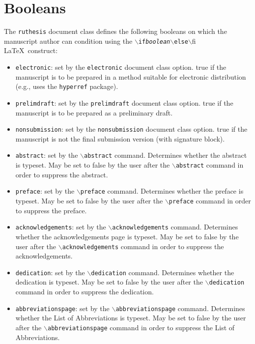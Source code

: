 \section{Booleans}
The \texttt{ruthesis} document class defines the following booleans on which the manuscript author can condition using the $\backslash$\texttt{if\it{boolean}}$\backslash$\texttt{else}$\backslash$fi \LaTeX\ construct:
\begin{itemize}
\item \texttt{electronic}: set by the \texttt{electronic} document class option.
      true if the manuscript is to be prepared in a method suitable for electronic distribution (e.g., uses the \texttt{hyperref} package).
\item \texttt{prelimdraft}: set by the \texttt{prelimdraft} document class option.
      true if the manuscript is to be prepared as a preliminary draft.
\item \texttt{nonsubmission}: set by the \texttt{nonsubmission} document class option.
      true if the manuscript is not the final submission version (with signature block).
\item \texttt{abstract}: set by the $\backslash$\texttt{abstract} command.
      Determines whether the abstract is typeset.
      May be set to false by the user after the $\backslash$\texttt{abstract} command in order to suppress the abstract.
\item \texttt{preface}: set by the $\backslash$\texttt{preface} command.
      Determines whether the preface is typeset.
      May be set to false by the user after the $\backslash$\texttt{preface} command in order to suppress the preface.
\item \texttt{acknowledgements}: set by the $\backslash$\texttt{acknowledgements} command.
      Determines whether the acknowledgements page is typeset.
      May be set to false by the user after the $\backslash$\texttt{acknowledgements} command in order to suppress the acknowledgements.
\item \texttt{dedication}: set by the $\backslash$\texttt{dedication} command.
      Determines whether the dedication is typeset.
      May be set to false by the user after the $\backslash$\texttt{dedication} command in order to suppress the dedication.
\item \texttt{abbreviationspage}: set by the $\backslash$\texttt{abbreviationspage} command.
      Determines whether the List of Abbreviations is typeset.
      May be set to false by the user after the $\backslash$\texttt{abbreviationspage} command in order to suppress the List of Abbreviations.
\end{itemize}


